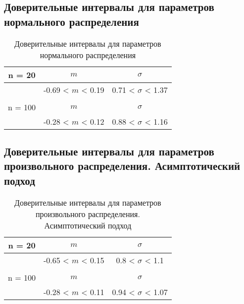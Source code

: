 \subsection{Доверительные интервалы для параметров нормального распределения}
\begin{table}[H]
	\centering
	\begin{tabular}{| c | c | c |}
		\hline
		n = 20   &  $m$  & $\sigma$\\ \hline
		&  -0.69 < $m$ < 0.19 & 0.71 < $\sigma$ < 1.37 \\ \hline
		&   &   \\ \hline
		n = 100   &  $m$  & $\sigma$\\ \hline
		& -0.28 < $m$ < 0.12 & 0.88 < $\sigma$ < 1.16 \\
		\hline
	\end{tabular}
	\caption{Доверительные интервалы для параметров нормального распределения}
	\label{tab:interv_simple}
\end{table}

\subsection{Доверительные интервалы для параметров произвольного распределения. Асимптотический подход}
\begin{table}[H]
	\centering
	\begin{tabular}{| c | c | c |}
		\hline
		n = 20   &  $m$  & $\sigma$\\ \hline
		&  -0.65 < $m$ < 0.15 & 0.8 < $\sigma$ < 1.1 \\ \hline
		&   &   \\ \hline
		n = 100   &  $m$  & $\sigma$\\ \hline
		& -0.28 < $m$ < 0.11 & 0.94 < $\sigma$ < 1.07 \\
		\hline
	\end{tabular}
	\caption{Доверительные интервалы для параметров произвольного распределения. Асимптотический подход}
	\label{tab:interv_asimpt}
\end{table}



	
